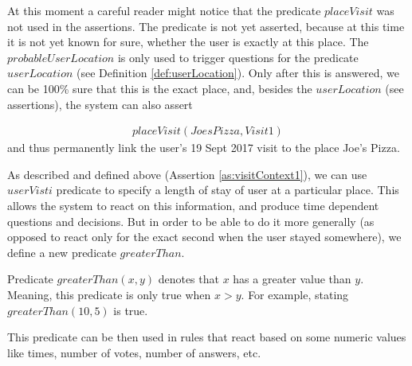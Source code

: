 At this moment a careful reader might notice that the predicate $placeVisit$ was
not used in the assertions. The predicate is not yet asserted, because at 
this time it is not yet known for sure, whether the user is exactly at this 
place. The $probableUserLocation$ is only used to trigger questions for the
predicate $userLocation$ (see Definition \ref{def:userLocation}). Only after 
this is answered, we can be
100\% sure that this is the exact place, and, besides the $userLocation$ (see
assertions), the system can also assert

\begin{equation}\label{as:placeVisit}
\begin{gathered}
	placeVisit(JoesPizza,Visit1)
\end{gathered}
\end{equation}
and thus permanently link the user's 19 Sept 2017 visit to the place 
Joe's Pizza.

As described and defined above (Assertion \ref{as:visitContext1}), we can use
$userVisti$ predicate to specify a length of stay of user at a particular place.
This allows the system to react on this information, and produce time dependent
questions and decisions. But in order to be able to do it more generally
(as opposed to react only for the exact second when the user stayed somewhere), we
define a new predicate $greaterThan$.

\begin{definition}\label{def:greaterThan}
Predicate $greaterThan(x,y)$ denotes that $x$ has a greater value than $y$. 
Meaning, this predicate is only true when $x > y$. For example, 
stating $greaterThan(10, 5)$ is true.
\end{definition}
This predicate can be then used in rules that react based on some numeric 
values like times, number of votes, number of answers, etc.

